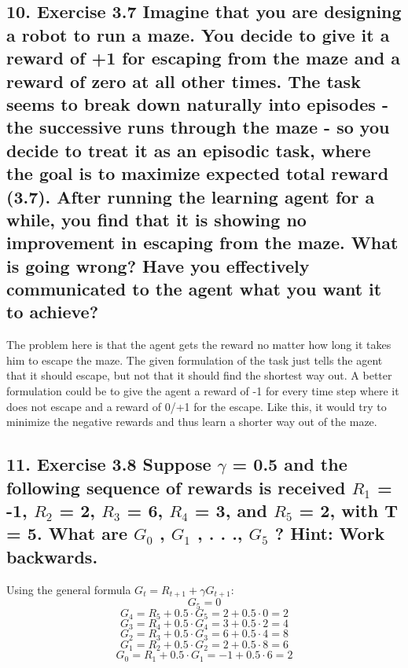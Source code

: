 \subsection*{10. Exercise 3.7 Imagine that you are designing a robot to run a maze. You decide to give it a reward of +1 for escaping from the maze and a reward of zero at all other times. The task seems to break down naturally into episodes - the successive runs through the maze - so you decide to treat it as an episodic task, where the goal is to maximize expected total reward (3.7). After running the learning agent for a while, you find that it is showing no improvement in escaping from the maze. What is going wrong? Have you effectively communicated to the agent what you want it to achieve?}
The problem here is that the agent gets the reward no matter how long it takes him to escape the maze. The given formulation of the task just tells the agent that it should escape, but not that it should find the shortest way out. A better formulation could be to give the agent a reward of -1 for every time step where it does not escape and a reward of 0/+1 for the escape. Like this, it would try to minimize the negative rewards and thus learn a shorter way out of the maze.

\subsection*{11. Exercise 3.8 Suppose $\gamma$ = 0.5 and the following sequence of rewards is received $R_1$ = -1, $R_2$ = 2, $R_3$ = 6, $R_4$ = 3, and $R_5$ = 2, with T = 5. What are $G_0$ , $G_1$ , . . ., $G_5$ ? Hint: Work backwards.}
Using the general formula $G_t = R_{t+1} + \gamma G_{t+1}$:
$$G_5 = 0$$
$$G_4 = R_5 + 0.5 \cdot G_5 = 2 + 0.5 \cdot 0 = 2$$
$$G_3 = R_4 + 0.5 \cdot G_4 = 3 + 0.5 \cdot 2 = 4$$
$$G_2 = R_3 + 0.5 \cdot G_3 = 6 + 0.5 \cdot 4 = 8$$
$$G_1 = R_2 + 0.5 \cdot G_2 = 2 + 0.5 \cdot 8 = 6$$
$$G_0 = R_1 + 0.5 \cdot G_1 = -1 + 0.5 \cdot 6 = 2$$

